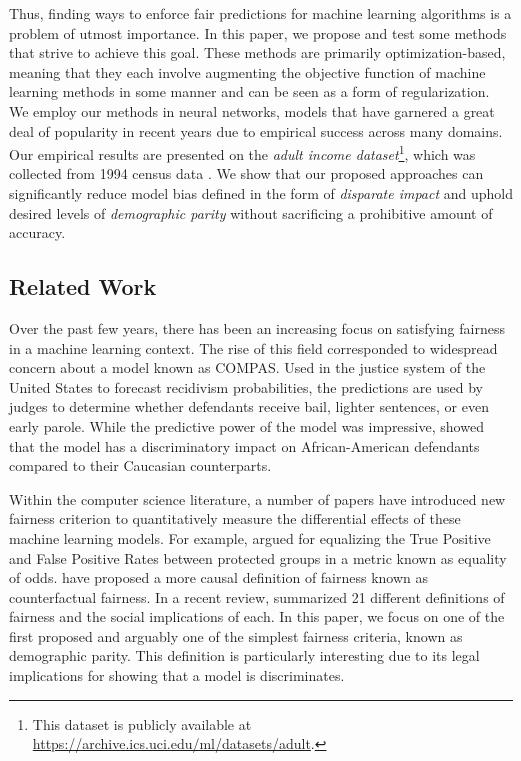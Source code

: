 \documentclass{article}
\begin{document}
Thus, finding ways to enforce fair predictions for machine learning algorithms is a problem of utmost importance.  In this paper, we propose and test some methods that strive to achieve this goal.  These methods are primarily optimization-based, meaning that they each involve augmenting the objective function of machine learning methods in some manner and can be seen as a form of regularization.  We employ our methods in neural networks, models that have garnered a great deal of popularity in recent years due to empirical success across many domains.  Our empirical results are presented on the \emph{adult income dataset}\footnote{This dataset is publicly available at \url{https://archive.ics.uci.edu/ml/datasets/adult}.}, which was collected from 1994 census data \citep{kohavi1996scaling}.  We show that our proposed approaches can significantly reduce model bias defined in the form of \emph{disparate impact} and uphold desired levels of \emph{demographic parity} without sacrificing a prohibitive amount of accuracy.             

\subsection{Related Work}
Over the past few years, there has been an increasing focus on satisfying fairness in a machine learning context. The rise of this field corresponded to widespread concern about a model known as COMPAS. Used in the justice system of the United States to forecast recidivism probabilities, the predictions are used by judges to determine whether defendants receive bail, lighter sentences, or even early parole. While the predictive power of the model was impressive, \cite{angwin2016machine} showed that the model has a discriminatory impact on African-American defendants compared to their Caucasian counterparts. 

Within the computer science literature, a number of papers have introduced new fairness criterion to quantitatively measure the differential effects of these machine learning models. For example, \cite{hardt2016equality} argued for equalizing the True Positive and False Positive Rates between protected groups in a metric known as equality of odds. \cite{kusner2017counterfactual} have proposed a more causal definition of fairness known as counterfactual fairness. In a recent review, \cite{narayanan} summarized 21 different definitions of fairness and the social implications of each. In this paper, we focus on one of the first proposed and arguably one of the simplest fairness criteria, known as demographic parity. This definition is particularly interesting due to its legal implications for showing that a model is discriminates.
\end{document}
